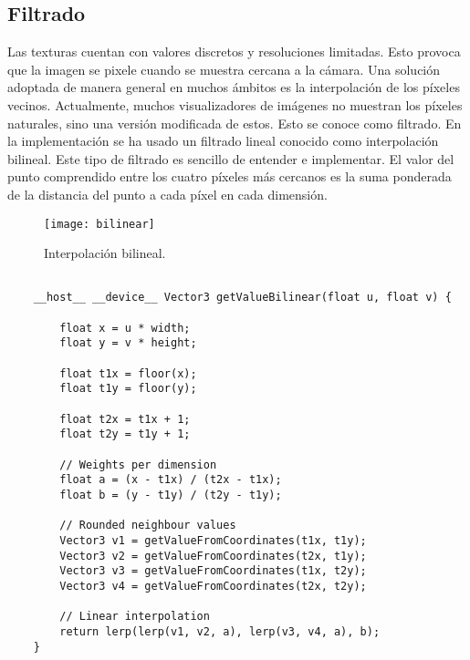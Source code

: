 \subsection{Filtrado}
			
Las texturas cuentan con valores discretos y resoluciones limitadas. Esto provoca que la imagen se pixele cuando se muestra cercana a la cámara. Una solución adoptada de manera general en muchos ámbitos es la interpolación de los píxeles vecinos. Actualmente, muchos visualizadores de imágenes no muestran los píxeles naturales, sino una versión modificada de estos. Esto se conoce como filtrado. En la implementación se ha usado un filtrado lineal conocido como interpolación bilineal. Este tipo de filtrado es sencillo de entender e implementar. El valor del punto  comprendido entre los cuatro píxeles más cercanos  es la suma ponderada de la distancia del punto a cada píxel en cada dimensión.
	
\begin{figure}[H]
	\label{fig:bilinear}
	\centering
	\texttt{[image: bilinear]}
	\caption{Interpolación bilineal.}
\end{figure}
	
\begin{minipage}[c]{0.95\textwidth}
\begin{lstlisting}[label={cod:bilinear}, caption={Código interpolación bilineal.}]
	
	__host__ __device__ Vector3 getValueBilinear(float u, float v) {
        
        float x = u * width;
        float y = v * height;

        float t1x = floor(x);
        float t1y = floor(y);

        float t2x = t1x + 1;
        float t2y = t1y + 1;

		// Weights per dimension
        float a = (x - t1x) / (t2x - t1x);
        float b = (y - t1y) / (t2y - t1y);

		// Rounded neighbour values
        Vector3 v1 = getValueFromCoordinates(t1x, t1y);
        Vector3 v2 = getValueFromCoordinates(t2x, t1y);
        Vector3 v3 = getValueFromCoordinates(t1x, t2y);
        Vector3 v4 = getValueFromCoordinates(t2x, t2y);

		// Linear interpolation
        return lerp(lerp(v1, v2, a), lerp(v3, v4, a), b);
	}
\end{lstlisting}
\end{minipage}	

